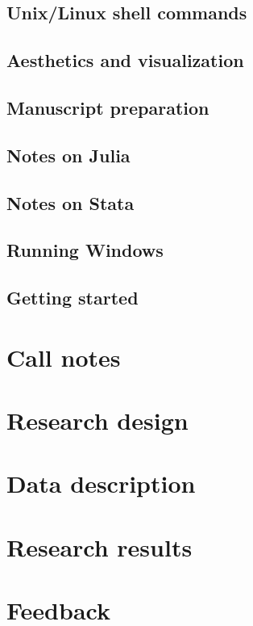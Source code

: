 \documentclass{report}
\numberwithin{equation}{section}
\numberwithin{figure}{section}
\numberwithin{table}{section}
\begin{document}
\section{Unix/Linux shell commands} 
\section{Aesthetics and visualization} 
\section{Manuscript preparation} 
\section{Notes on Julia} 
\section{Notes on Stata} 
\section{Running Windows} 

\section{Getting started} 

\chapter{Call notes}

\chapter{Research design}

\chapter{Data description}

\chapter{Research results}

\chapter{Feedback}

\end{document}
